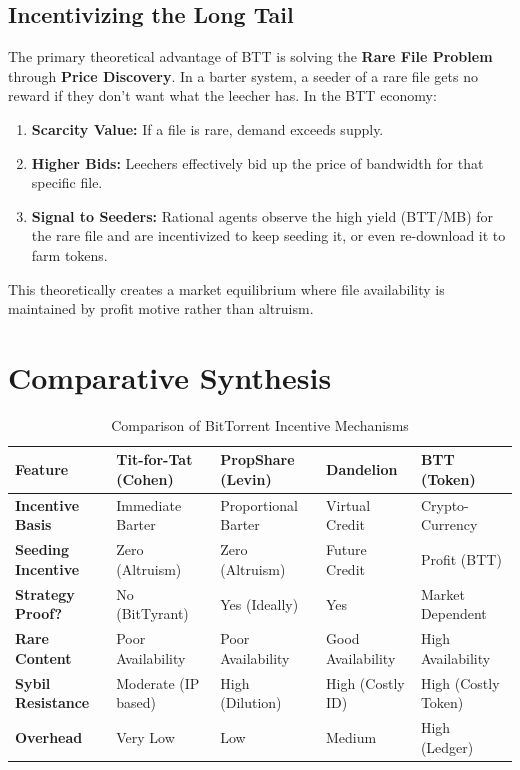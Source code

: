 \documentclass[12pt]{article}
\begin{document}
\subsection{Incentivizing the Long Tail}
The primary theoretical advantage of BTT is solving the \textbf{Rare File Problem} through \textbf{Price Discovery}.
In a barter system, a seeder of a rare file gets no reward if they don't want what the leecher has. In the BTT economy:
\begin{enumerate}
    \item \textbf{Scarcity Value:} If a file is rare, demand exceeds supply.
    \item \textbf{Higher Bids:} Leechers effectively bid up the price of bandwidth for that specific file.
    \item \textbf{Signal to Seeders:} Rational agents observe the high yield (BTT/MB) for the rare file and are incentivized to keep seeding it, or even re-download it to farm tokens.
\end{enumerate}
This theoretically creates a market equilibrium where file availability is maintained by profit motive rather than altruism.

\section{Comparative Synthesis}

\begin{table}[H]
\centering
\caption{Comparison of BitTorrent Incentive Mechanisms}
\label{tab:comparison}
\begin{tabular}{@{}p{3cm}p{3cm}p{3cm}p{3cm}p{3cm}@{}}
\toprule
\textbf{Feature} & \textbf{Tit-for-Tat (Cohen)} & \textbf{PropShare (Levin)} & \textbf{Dandelion} & \textbf{BTT (Token)} \\ \midrule
\textbf{Incentive Basis} & Immediate Barter & Proportional Barter & Virtual Credit & Crypto-Currency \\
\textbf{Seeding Incentive} & Zero (Altruism) & Zero (Altruism) & Future Credit & Profit (BTT) \\
\textbf{Strategy Proof?} & No (BitTyrant) & Yes (Ideally) & Yes & Market Dependent \\
\textbf{Rare Content} & Poor Availability & Poor Availability & Good Availability & High Availability \\
\textbf{Sybil Resistance} & Moderate (IP based) & High (Dilution) & High (Costly ID) & High (Costly Token) \\ 
\textbf{Overhead} & Very Low & Low & Medium & High (Ledger) \\ \bottomrule
\end{tabular}
\end{table}
\end{document}
